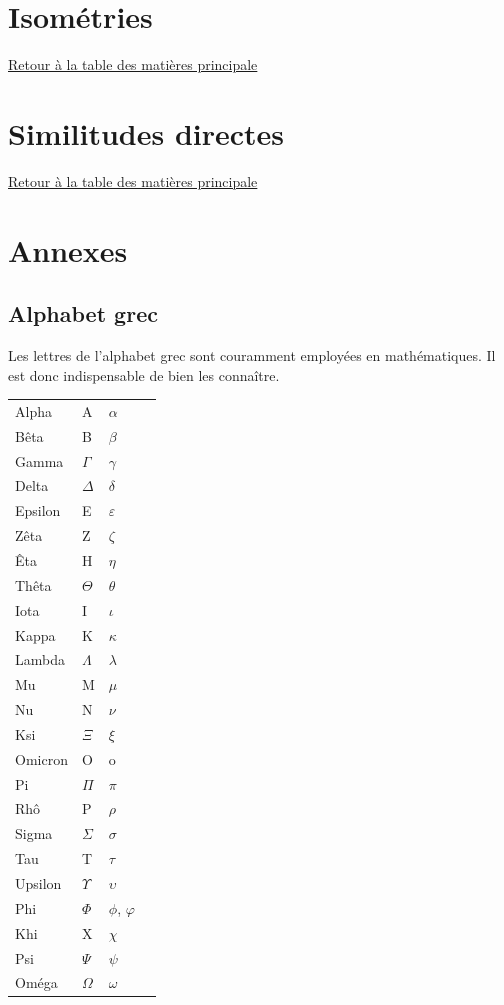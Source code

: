 \documentclass[11pt,a4paper,oneside]{book}
\newcommand{\retourTOC}{Retour à la table des matières principale}
\theoremstyle{definition}
\theoremstyle{plain}
\begin{document}
\chapter{Isométries}
\minitoc
\hyperlink{toc}{\retourTOC}



\chapter{Similitudes directes}
\minitoc
\hyperlink{toc}{\retourTOC}



\appendix
\chapter{Annexes}

\newpage
\section{Alphabet grec}

\noindent Les lettres de l'alphabet grec sont couramment employées en mathématiques. Il est donc indispensable de bien les connaître.

\begin{center}

\def\arraystretch{1.2}
\setlength\tabcolsep{20pt}
\begin{tabular}{llll}
Alpha		& A 			& $\alpha$\\
Bêta			& B 			& $\beta$\\
Gamma		& $\Gamma$ 	& $\gamma$\\
Delta		& $\Delta$ 	& $\delta$\\
Epsilon		& E 			& $\varepsilon$\\
Zêta			& Z 			& $\zeta$\\
Êta			& H 			& $\eta$\\
Thêta		& $\Theta$ 	& $\theta$\\
Iota			& I 			& $\iota$\\
Kappa		& K 			& $\kappa$\\
Lambda		& $\Lambda$ 	& $\lambda$\\
Mu			& M 			& $\mu$\\
Nu			& N 			& $\nu$\\
Ksi			& $\Xi$ 		& $\xi$\\
Omicron		& O 			& o\\
Pi			& $\Pi$ 		& $\pi$\\
Rhô			& P 			& $\rho$\\
Sigma		& $\Sigma$ 	& $\sigma$\\
Tau			& T 			& $\tau$\\
Upsilon		& $\Upsilon$& $\upsilon$\\
Phi			& $\Phi$ 	& $\phi$, $\varphi$\\
Khi			& X 			& $\chi$\\
Psi			& $\Psi$ 	& $\psi$ \\
Oméga		& $\Omega$ 	& $\omega$\\
\end{tabular}
\end{center}
\end{document}
